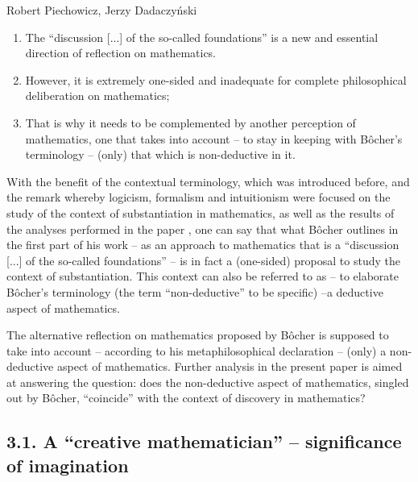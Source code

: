 \begin{artengenv}{Robert Piechowicz, Jerzy Dadaczyński}
\begin{enumerate}
\item The ``discussion [...] of the so-called foundations'' is a new and essential direction of reflection on mathematics.
\item However, it is extremely one-sided and inadequate for complete philosophical deliberation on mathematics;
\item That is why it needs to be complemented by another perception of mathematics, one that takes into account -- to stay in keeping with Bôcher's terminology -- (only) that which is non-deductive in it.
\end{enumerate}
With the benefit of the contextual terminology, which was introduced before, and the remark whereby logicism, formalism and intuitionism were focused on the study of the context of substantiation in mathematics, as well as the results of the analyses performed in the paper
\parencite[][]{dadaczynski_tendencje_2015},
 one can say that what Bôcher outlines in the first part of his work -- as an approach to mathematics that is a ``discussion [...] of the so-called foundations'' -- is in fact a (one-sided) proposal to study the context of substantiation. This context can also be referred to as -- to elaborate Bôcher's terminology (the term ``non-deductive'' to be specific) –a deductive aspect of mathematics.

The alternative reflection on mathematics proposed by Bôcher is supposed to take into account -- according to his metaphilosophical declaration -- (only) a non-deductive aspect of mathematics. Further analysis in the present paper is aimed at answering the question: does the non-deductive aspect of mathematics, singled out by Bôcher, ``coincide'' with the context of discovery in mathematics?

\subsection{3.1. A ``creative mathematician'' -- significance of imagination}


\end{artengenv}
